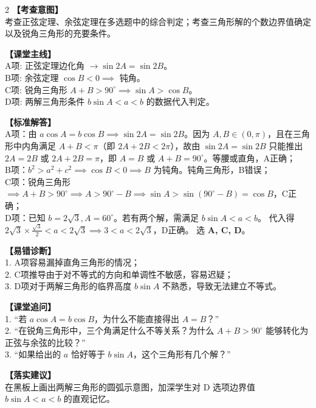 \documentclass[11pt,a4paper]{ctexart}
\begin{document}
\par\vspace{0.8em}\vspace{0.8em}

\newpage


\qTJWTriangleIdentitiesStem
\qTJWTriangleIdentitiesOptions

\vspace{0.8em}

\begin{paracol}{2}
  \textbf{【考查意图】}\\
  考查正弦定理、余弦定理在多选题中的综合判定；考查三角形解的个数边界值确定以及锐角三角形的充要条件。
  
  \textbf{【课堂主线】}\\
  A项: 正弦定理边化角 $\to \sin 2A = \sin 2B$。\\
  B项: 余弦定理 $\cos B < 0 \implies$ 钝角。\\
  C项: 锐角三角形 $A+B > 90^\circ \implies \sin A > \cos B$。\\
  D项: 两解三角形条件 $b\sin A < a < b$ 的数据代入判定。
  
  \textbf{【标准解答】}\\
  A项：由 $a\cos A = b\cos B \implies \sin 2A = \sin 2B$。因为 $A, B \in (0, \pi)$，且在三角形中内角满足 $A+B < \pi$（即 $2A+2B < 2\pi$），故由 $\sin 2A = \sin 2B$ 只能推出 $2A=2B$ 或 $2A+2B=\pi$，即 $A=B$ 或 $A+B=90^\circ$。等腰或直角，A正确；\\
  B项：$b^2 > a^2 + c^2 \implies \cos B < 0 \implies B$ 为钝角。钝角三角形，B错误；\\
  C项：锐角三角形 $\implies A+B > 90^\circ \implies A > 90^\circ - B \implies \sin A > \sin(90^\circ-B) = \cos B$，C正确；\\
  D项：已知 $b=2\sqrt{3}, A=60^\circ$。若有两个解，需满足 $b\sin A < a < b$。
  代入得 $2\sqrt{3}\times\frac{\sqrt{3}}{2} < a < 2\sqrt{3} \implies 3 < a < 2\sqrt{3}$，D正确。
  选 \textbf{A, C, D}。

  \switchcolumn
  \textbf{【易错诊断】}\\
  1. A项容易漏掉直角三角形的情况；\\
  2. C项推导由于对不等式的方向和单调性不敏感，容易迟疑；\\
  3. D项对于两解三角形的临界高度 $b\sin A$ 不熟悉，导致无法建立不等式。
  
  \textbf{【课堂追问】}\\
  1. “若 $a\cos A = b\cos B$，为什么不能直接得出 $A=B$？”\\
  2. “在锐角三角形中，三个角满足什么不等关系？为什么 $A+B>90^\circ$ 能够转化为正弦与余弦的比较？”\\
  3. “如果给出的 $a$ 恰好等于 $b\sin A$，这个三角形有几个解？”
  
  \textbf{【落实建议】}\\
  在黑板上画出两解三角形的圆弧示意图，加深学生对 D 选项边界值 $b\sin A < a < b$ 的直观记忆。
\end{paracol}
\end{document}
